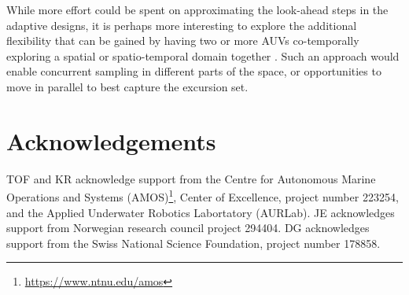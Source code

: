 \documentclass[aoas]{imsart}
\begin{document}
While more effort could be spent on approximating the look-ahead steps
in the adaptive designs, it is perhaps more interesting to explore the
additional flexibility that can be gained by having two or more AUVs
co-temporally exploring a spatial or spatio-temporal domain together
\citep{ferreira2019advancing}. Such an approach would enable
concurrent sampling in different parts of the space, or opportunities
to move in parallel to best capture the excursion set.

\section*{Acknowledgements}

TOF and KR acknowledge support from the Centre for Autonomous Marine
Operations and Systems
(AMOS)\footnote{\url{https://www.ntnu.edu/amos}}, Center of
Excellence, project number 223254, and the Applied Underwater Robotics
Labortatory (AURLab). JE acknowledges support from Norwegian research
council project 294404. DG acknowledges support from the Swiss
National Science Foundation, project number 178858.


\footnotesize



\end{document}
